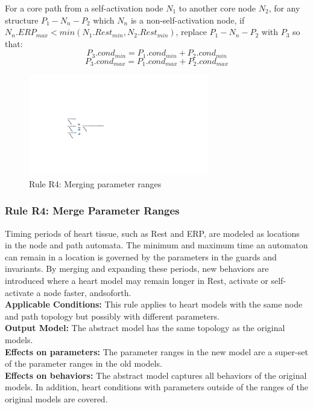 For a core path from a self-activation node $N_1$ to another core node $N_2$, for any structure $P_1-N_n-P_2$ which $N_n$ is a non-self-activation node, if $N_n.ERP_{max}<min(N_1.Rest_{min},N_2.Rest_{min})$, replace $P_1-N_n-P_2$ with $P_3$ so that:
$$P_3.cond_{min}=P_1.cond_{min}+P_2.cond_{min}$$
$$P_3.cond_{max}=P_1.cond_{max}+P_2.cond_{max}$$
\begin{figure}[!h]
	\centering
	\includegraphics[width=0.7\textwidth]{figs/rule4.pdf}
	\caption{\small Rule R4: Merging parameter ranges}
	\label{fig:rule4}
\end{figure}
\subsubsection{Rule R4: Merge Parameter Ranges}
Timing periods of heart tissue, such as Rest and ERP, are modeled as locations in the node and path automata. 
The minimum and maximum time an automaton can remain in a location is governed by the parameters in the guards and invariants. 
By merging and expanding these periods, new behaviors are introduced where a heart model may remain longer in Rest, activate or self-activate a node faster, andsoforth.
\\
\textbf{Applicable Conditions: }
This rule applies to heart models with the same node and path topology but possibly with different parameters.\\
\textbf{Output Model: }The abstract model has the same topology as the original models.\\
\textbf{Effects on parameters:} The parameter ranges in the new model are a super-set of the parameter ranges in the old models.\\
\textbf{Effects on behaviors: }The abstract model captures all behaviors of the original models. In addition, heart conditions with parameters outside of the ranges of the original models are covered.

